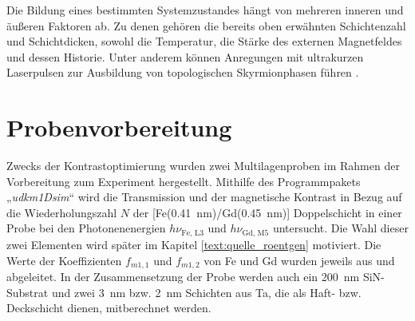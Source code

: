 \noindent
Die Bildung eines bestimmten Systemzustandes hängt von mehreren inneren und äußeren Faktoren ab. Zu denen gehören die bereits oben erwähnten Schichtenzahl und Schichtdicken, sowohl die Temperatur, die Stärke des externen Magnetfeldes und dessen Historie. Unter anderem können Anregungen mit ultrakurzen Laserpulsen zur Ausbildung von topologischen Skyrmionphasen führen \cite{buttner_observation_2021}.



\section{Probenvorbereitung}
Zwecks der Kontrastoptimierung wurden zwei Multilagenproben im Rahmen der Vorbereitung zum Experiment hergestellt. Mithilfe des Programmpakets „\emph{udkm1Dsim}“ \cite{schick_udkm1dsim_2021} wird die Transmission und der magnetische Kontrast in Bezug auf die Wiederholungszahl $N$ der [Fe(\SI{0.41}{\nano\meter})/Gd(\SI{0.45}{\nano\meter})] Doppelschicht in einer Probe bei den Photonenenergien $h\nu_{\text{Fe, L3}}$ und $h\nu_{\text{Gd, M5}}$ untersucht. Die Wahl dieser zwei Elementen wird später im Kapitel \ref{text:quelle_roentgen} motiviert. Die Werte der Koeffizienten $f_{m1,1}$ und $f_{m1,2}$ von Fe und Gd wurden jeweils aus \cite[Abb. 4]{kortright_resonant_2000} und \cite[Abb. 2]{prieto-x-ray-2005} abgeleitet. In der Zusammensetzung der Probe werden auch ein \SI{200}{\nano\meter} SiN-Substrat und zwei \SI{3}{\nano\meter} bzw. \SI{2}{\nano\meter} Schichten aus Ta, die als Haft- bzw. Deckschicht dienen, mitberechnet werden.

